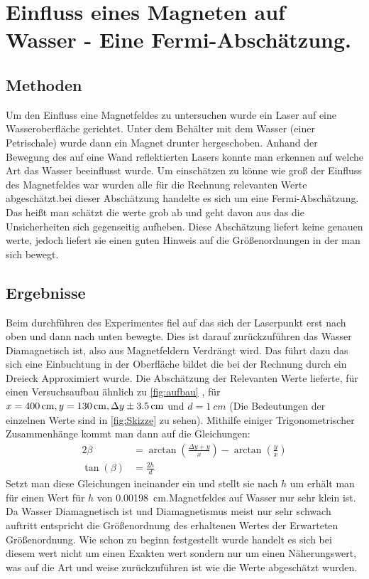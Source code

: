 \section{Einfluss eines Magneten auf Wasser - Eine Fermi-Abschätzung. }
\subsection{Methoden}
Um den Einfluss eine Magnetfeldes zu untersuchen wurde ein Laser auf eine Wasseroberfläche gerichtet. Unter dem Behälter mit dem Wasser (einer Petrischale) wurde dann ein Magnet drunter hergeschoben. Anhand der Bewegung des auf eine Wand reflektierten Lasers konnte man erkennen auf welche Art das Wasser beeinflusst wurde.
Um einschätzen zu könne wie groß der Einfluss des Magnetfeldes war wurden alle für die Rechnung relevanten Werte abgeschätzt.bei dieser Abschätzung handelte es sich um eine Fermi-Abschätzung. Das heißt man schätzt die werte grob ab und geht davon aus das die Unsicherheiten sich gegenseitig aufheben. Diese Abschätzung liefert keine genauen werte, jedoch liefert sie einen guten Hinweis  auf die Größenordnungen in der man sich bewegt.
\subsection{Ergebnisse}
Beim durchführen des Experimentes fiel auf das sich der Laserpunkt erst nach oben und dann nach unten bewegte. Dies ist darauf zurückzuführen das Wasser Diamagnetisch ist, also aus Magnetfeldern Verdrängt wird. Das führt dazu das sich eine Einbuchtung in der Oberfläche bildet die bei der Rechnung durch ein Dreieck Approximiert wurde.
Die Abschätzung der Relevanten Werte lieferte, für einen Versuchsaufbau ähnlich zu \cref{fig:aufbau} , für $x=\SI{400}{cm}, y=\SI{130}{cm}, \Delta y\SI{+- 3,5}{cm}$ und $d=\SI{1}{cm}$ (Die Bedeutungen der einzelnen Werte sind in \cref{fig:Skizze} zu sehen). Mithilfe einiger Trigonometrischer Zusammenhänge kommt man dann auf die Gleichungen:
\begin{align}
	2\beta &= \arctan \left(\frac{\Delta y + y}{x}\right)  - \arctan\left( \frac{y}{x}\right)\\ 
	\tan(\beta) &= \frac{2h}{d}
\end{align}
Setzt man diese Gleichungen ineinander ein und stellt sie nach $h$ um erhält man für einen Wert für $h$ von \SI{0,00198}{cm}.Magnetfeldes auf Wasser nur sehr klein ist. Da Wasser Diamagnetisch ist und Diamagnetismus meist nur sehr schwach auftritt entspricht die Größenordnung des erhaltenen Wertes der Erwarteten Größenordnung.
Wie schon zu beginn festgestellt wurde handelt es sich bei diesem wert nicht um einen Exakten wert sondern nur um einen Näherungswert, was auf die Art und weise zurückzuführen ist wie die Werte abgeschätzt wurden.



